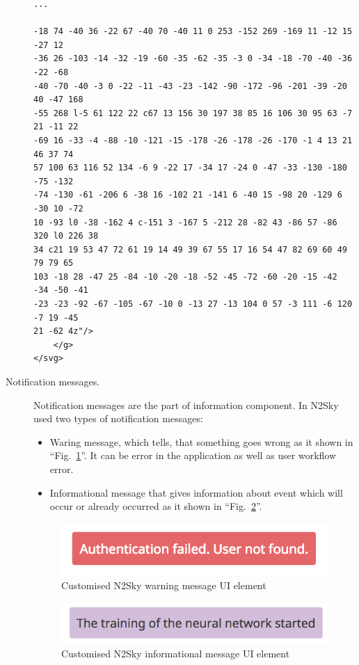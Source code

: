\begin{description}
\begin{lstlisting}
...

-18 74 -40 36 -22 67 -40 70 -40 11 0 253 -152 269 -169 11 -12 15 -27 12 
-36 26 -103 -14 -32 -19 -60 -35 -62 -35 -3 0 -34 -18 -70 -40 -36 -22 -68
-40 -70 -40 -3 0 -22 -11 -43 -23 -142 -90 -172 -96 -201 -39 -20 40 -47 168
-55 268 l-5 61 122 22 c67 13 156 30 197 38 85 16 106 30 95 63 -7 21 -11 22
-69 16 -33 -4 -88 -10 -121 -15 -178 -26 -178 -26 -170 -1 4 13 21 46 37 74
57 100 63 116 52 134 -6 9 -22 17 -34 17 -24 0 -47 -33 -130 -180 -75 -132
-74 -130 -61 -206 6 -38 16 -102 21 -141 6 -40 15 -98 20 -129 6 -30 10 -72
10 -93 l0 -38 -162 4 c-151 3 -167 5 -212 28 -82 43 -86 57 -86 320 l0 226 38
34 c21 19 53 47 72 61 19 14 49 39 67 55 17 16 54 47 82 69 60 49 79 79 65
103 -18 28 -47 25 -84 -10 -20 -18 -52 -45 -72 -60 -20 -15 -42 -34 -50 -41
-23 -23 -92 -67 -105 -67 -10 0 -13 27 -13 104 0 57 -3 111 -6 120 -7 19 -45
21 -62 4z"/>
    </g>
</svg>
\end{lstlisting}

\item[Notification messages.] Notification messages are the part of information component. In N2Sky used two types of notification messages: 
\begin{itemize}
\item Waring message, which tells, that something goes wrong as it shown in ``Fig.~\ref{fig:notif_warning}''. It can be error in the application as well as user workflow error. 
\item Informational message that gives information about event which will occur or already occurred as it shown in ``Fig.~\ref{fig:notif_info}''.
\end{itemize}


\begin{figure}[htbp]
\begin{center}
  \includegraphics[scale=0.65]{components/3/components/notif_warning.png}
  \caption{Customised N2Sky warning message UI element}
  \label{fig:notif_warning}
\end{center}
\end{figure}

\begin{figure}[htbp]
\begin{center}
  \includegraphics[scale=0.65]{components/3/components/notif_info.png}
  \caption{Customised N2Sky informational message UI element}
  \label{fig:notif_info}
\end{center}
\end{figure}


\end{description}
